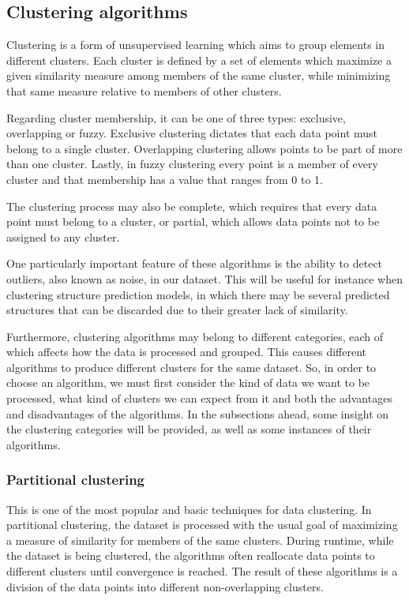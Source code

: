 \medskip
\subsection{Clustering algorithms}

Clustering is a form of unsupervised learning which aims to group elements in different clusters. Each cluster is defined by a set of elements which maximize a given similarity measure among members of the same cluster, while minimizing that same measure relative to members of other clusters.

Regarding cluster membership, it can be one of three types: exclusive, overlapping or fuzzy. Exclusive clustering dictates that each data point must belong to a single cluster. Overlapping clustering allows points to be part of more than one cluster. Lastly, in fuzzy clustering every point is a member of every cluster and that membership has a value that ranges from 0 to 1. 

The clustering process may also be complete, which requires that every data point must belong to a cluster, or partial, which allows data points not to be assigned to any cluster.

One particularly important feature of these algorithms is the ability to detect outliers, also known as noise, in our dataset. This will be useful for instance when clustering structure prediction models, in which there may be several predicted structures that can be discarded due to their greater lack of similarity.

Furthermore, clustering algorithms may belong to different categories, each of which affects how the data is processed and grouped. This causes different algorithms to produce different clusters for the same dataset. So, in order to choose an algorithm, we must first consider the kind of data we want to be processed, what kind of clusters we can expect from it and both the advantages and disadvantages of the algorithms. In the subsections ahead, some insight on the clustering categories will be provided, as well as some instances of their algorithms.

\medskip
\subsubsection{Partitional clustering}

This is one of the most popular and basic techniques for data clustering. In partitional clustering, the dataset is processed with the usual goal of maximizing a measure of similarity for members of the same clusters. During runtime, while the dataset is being clustered, the algorithms often reallocate data points to different clusters until convergence is reached. The result of these algorithms is a division of the data points into different non-overlapping clusters.

